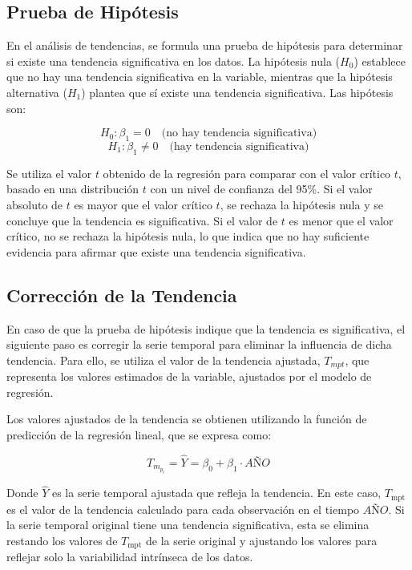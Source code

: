 \subsection{Prueba de Hipótesis}

En el análisis de tendencias, se formula una prueba de hipótesis para determinar si existe una tendencia significativa en los datos. La hipótesis nula (\( H_0 \)) establece que no hay una tendencia significativa en la variable, mientras que la hipótesis alternativa (\( H_1 \)) plantea que sí existe una tendencia significativa. Las hipótesis son:

\[
H_0: \beta_1 = 0 \quad \text{(no hay tendencia significativa)}
\]
\[
H_1: \beta_1 \neq 0 \quad \text{(hay tendencia significativa)}
\]

Se utiliza el valor \( t \) obtenido de la regresión para comparar con el valor crítico \( t \), basado en una distribución \( t \) con un nivel de confianza del 95\%. Si el valor absoluto de \( t \) es mayor que el valor crítico \( t \), se rechaza la hipótesis nula y se concluye que la tendencia es significativa. Si el valor de \( t \) es menor que el valor crítico, no se rechaza la hipótesis nula, lo que indica que no hay suficiente evidencia para afirmar que existe una tendencia significativa.

\subsection{Corrección de la Tendencia}

En caso de que la prueba de hipótesis indique que la tendencia es significativa, el siguiente paso es corregir la serie temporal para eliminar la influencia de dicha tendencia. Para ello, se utiliza el valor de la tendencia ajustada, \( T_{mpt} \), que representa los valores estimados de la variable, ajustados por el modelo de regresión.


Los valores ajustados de la tendencia se obtienen utilizando la función de predicción de la regresión lineal, que se expresa como:

\[
T_{m_{p_t}} = \hat{Y} = \beta_0 + \beta_1 \cdot AÑO
\]


Donde \( \hat{Y} \) es la serie temporal ajustada que refleja la tendencia. En este caso, \( T_{\text{mpt}} \) es el valor de la tendencia calculado para cada observación en el tiempo \( AÑO \). Si la serie temporal original tiene una tendencia significativa, esta se elimina restando los valores de \( T_{\text{mpt}} \) de la serie original y ajustando los valores para reflejar solo la variabilidad intrínseca de los datos.


